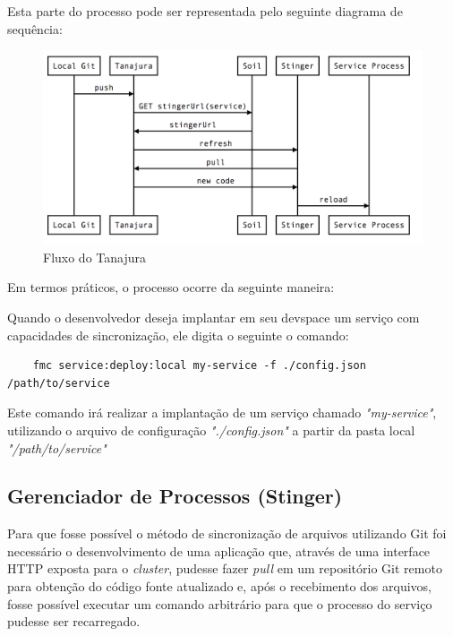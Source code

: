 	Esta parte do processo pode ser representada pelo seguinte diagrama de sequência:
		\begin{figure}[htb]
			\caption{\label{fig_arquitetura2}Fluxo do Tanajura}
			\begin{center}
			\includegraphics[scale=0.29]{pictures/tanajura-flow.png}
			\end{center}
		\end{figure}

	Em termos práticos, o processo ocorre da seguinte maneira:
	
	Quando o desenvolvedor deseja implantar em seu devspace um serviço com capacidades de sincronização, ele digita o seguinte o comando:

	\begin{verbatim}
	fmc service:deploy:local my-service -f ./config.json /path/to/service
	\end{verbatim}

	Este comando irá realizar a implantação de um serviço chamado \textit{"my-service"}, utilizando o arquivo de configuração \textit{"./config.json"} a partir da pasta local \textit{"/path/to/service"}

	\subsection{Gerenciador de Processos (Stinger)}	
	
	Para que fosse possível o método de sincronização de arquivos utilizando Git foi necessário o desenvolvimento de uma aplicação que, através de uma interface HTTP exposta para o \textit{cluster}, pudesse fazer \textit{pull} em um repositório Git remoto para obtenção do código fonte atualizado e, após o recebimento dos arquivos, fosse possível executar um comando arbitrário para que o processo do serviço pudesse ser recarregado.
	
